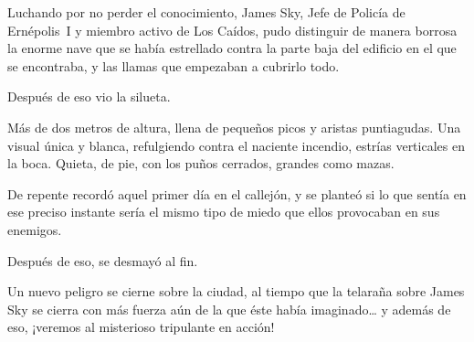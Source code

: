 Luchando por no perder el conocimiento, James Sky, Jefe de Policía de Ernépolis~I y miembro activo de Los Caídos, pudo distinguir de manera borrosa la enorme nave que se había estrellado contra la parte baja del edificio en el que se encontraba, y las llamas que empezaban a cubrirlo todo.

Después de eso vio la silueta.

Más de dos metros de altura, llena de pequeños picos y aristas puntiagudas. Una visual única y blanca, refulgiendo contra el naciente incendio, estrías verticales en la boca. Quieta, de pie, con los puños cerrados, grandes como mazas.

De repente recordó aquel primer día en el callejón, y se planteó si lo que sentía en ese preciso instante sería el mismo tipo de miedo que ellos provocaban en sus enemigos.

Después de eso, se desmayó al fin.

\begin{next}
    Un nuevo peligro se cierne sobre la ciudad, al tiempo que la telaraña sobre James Sky se cierra con más fuerza aún de la que éste había imaginado\dots{} y además de eso, ¡veremos al misterioso tripulante en acción!
\end{next}

\endinput
